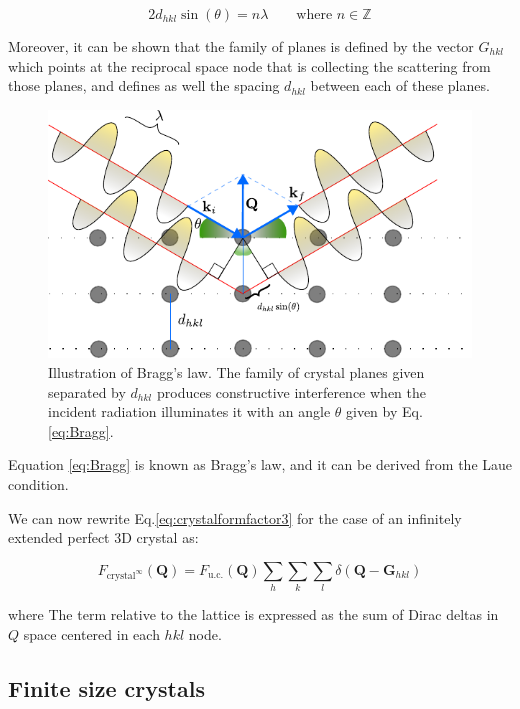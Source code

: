 \begin{equation}
    2 d_{hkl} \sin(\theta) = n \lambda  \qquad \text{where  } n \in \mathbb{Z}
   \label{eq:Bragg}
\end{equation}

Moreover, it can be shown that the family of planes is defined by the vector $G_{hkl}$ which points at the reciprocal space 
node that is collecting the scattering from those planes, and defines as well the spacing $d_{hkl}$ between each of 
these planes. 

\begin{figure}[H]
    \centering
    \includegraphics[width=\textwidth]{figures/Intro/bragg.pdf}
    \caption{Illustration of Bragg's law. The family of crystal planes given separated by $d_{hkl}$ produces constructive interference 
    when the incident radiation illuminates it with an angle  $\theta$ given by Eq.\ref{eq:Bragg}.} 
    \label{fig:bragg}
\end{figure}

Equation \ref{eq:Bragg} is known as Bragg's law, and it can be derived from the Laue condition. 

We can now rewrite Eq.\ref{eq:crystalformfactor3} for the case of an infinitely extended perfect 3D crystal as: 

\begin{equation}
    F_{\text{crystal}^{\infty}}(\mathbf{Q}) = F_{\text{u.c.}}(\mathbf{Q}) 
    \sum_{h} \sum_{k} \sum_{l} 
    \delta\!\left(\mathbf Q - \mathbf{G}_{hkl}\right)
    \label{eq:crystalformfactor4}
\end{equation}
    
where The term relative to the lattice is expressed as the sum of Dirac deltas in $Q$ space centered in each $hkl$ node. 


\subsection{Finite size crystals}

